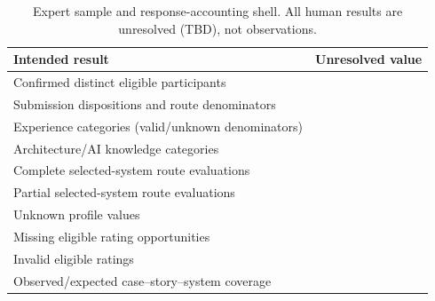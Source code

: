\begin{table}[t]
\caption{Expert sample and response-accounting shell.
All human results are unresolved (TBD), not observations.}
\label{tab:expert-demographics}
\centering\small
\begin{tabular}{@{}p{}p{}@{}}
\hline
\textbf{Intended result} & \textbf{Unresolved value} \\
\hline
Confirmed distinct eligible participants & \ExpertParticipantCountTBD{} \\
Submission dispositions and route denominators & \ExpertSubmissionDispositionTBD{} \\
Experience categories (valid/unknown denominators) & \ExpertExperienceTBD{} \\
Architecture/AI knowledge categories & \ExpertKnowledgeTBD{} \\
Complete selected-system route evaluations & \ExpertCompletedSystemEvaluationsTBD{} \\
Partial selected-system route evaluations & \ExpertPartialSystemEvaluationsTBD{} \\
Unknown profile values & \ExpertUnknownProfilesTBD{} \\
Missing eligible rating opportunities & \ExpertMissingResponsesTBD{} \\
Invalid eligible ratings & \ExpertInvalidResponsesTBD{} \\
Observed/expected case--story--system coverage & \ExpertCoverageTBD{} \\
\hline
\end{tabular}
\end{table}
